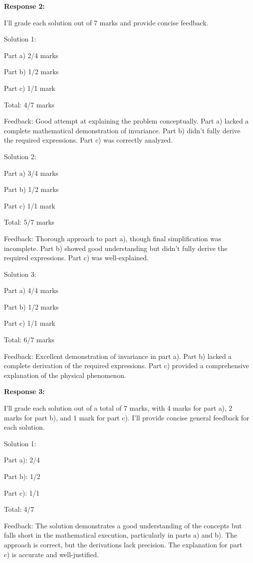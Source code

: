 \documentclass[a4paper,11pt]{article}
\begin{document}
\bigskip
\textbf{Response 2:}

I'll grade each solution out of 7 marks and provide concise feedback.

Solution 1:

Part a) 2/4 marks

Part b) 1/2 marks

Part c) 1/1 mark

Total: 4/7 marks

Feedback: Good attempt at explaining the problem conceptually. Part a) lacked a complete mathematical demonstration of invariance. Part b) didn't fully derive the required expressions. Part c) was correctly analyzed.

Solution 2:

Part a) 3/4 marks

Part b) 1/2 marks

Part c) 1/1 mark

Total: 5/7 marks

Feedback: Thorough approach to part a), though final simplification was incomplete. Part b) showed good understanding but didn't fully derive the required expressions. Part c) was well-explained.

Solution 3:

Part a) 4/4 marks

Part b) 1/2 marks

Part c) 1/1 mark

Total: 6/7 marks

Feedback: Excellent demonstration of invariance in part a). Part b) lacked a complete derivation of the required expressions. Part c) provided a comprehensive explanation of the physical phenomenon.

\bigskip
\textbf{Response 3:}

I'll grade each solution out of a total of 7 marks, with 4 marks for part a), 2 marks for part b), and 1 mark for part c). I'll provide concise general feedback for each solution.

Solution 1:

Part a): 2/4

Part b): 1/2

Part c): 1/1

Total: 4/7

Feedback: The solution demonstrates a good understanding of the concepts but falls short in the mathematical execution, particularly in parts a) and b). The approach is correct, but the derivations lack precision. The explanation for part c) is accurate and well-justified.
\end{document}
